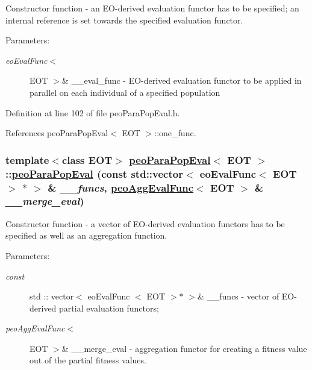 Constructor function - an EO-derived evaluation functor has to be specified; an internal reference is set towards the specified evaluation functor. 

\begin{Desc}
\item[Parameters:]
\begin{description}
\item[{\em eo\-Eval\-Func$<$}]EOT $>$\& \_\-\_\-eval\_\-func - EO-derived evaluation functor to be applied in parallel on each individual of a specified population \end{description}
\end{Desc}


Definition at line 102 of file peo\-Para\-Pop\-Eval.h.

References peo\-Para\-Pop\-Eval$<$ EOT $>$::one\_\-func.\hypertarget{classpeoParaPopEval_1cc13a1ec366f95d219d682eccb455bc}{
\subsubsection[peoParaPopEval]{\setlength{\rightskip}{0pt plus 5cm}template$<$class EOT$>$ \hyperlink{classpeoParaPopEval}{peo\-Para\-Pop\-Eval}$<$ EOT $>$::\hyperlink{classpeoParaPopEval}{peo\-Para\-Pop\-Eval} (const std::vector$<$ eo\-Eval\-Func$<$ EOT $>$ $\ast$ $>$ \& {\em \_\-\_\-funcs}, \hyperlink{classpeoAggEvalFunc}{peo\-Agg\-Eval\-Func}$<$ EOT $>$ \& {\em \_\-\_\-merge\_\-eval})}}
\label{classpeoParaPopEval_1cc13a1ec366f95d219d682eccb455bc}


Constructor function - a vector of EO-derived evaluation functors has to be specified as well as an aggregation function. 

\begin{Desc}
\item[Parameters:]
\begin{description}
\item[{\em const}]std :: vector$<$ eo\-Eval\-Func $<$ EOT $>$$\ast$ $>$\& \_\-\_\-funcs - vector of EO-derived partial evaluation functors; \item[{\em peo\-Agg\-Eval\-Func$<$}]EOT $>$\& \_\-\_\-merge\_\-eval - aggregation functor for creating a fitness value out of the partial fitness values. \end{description}
\end{Desc}


